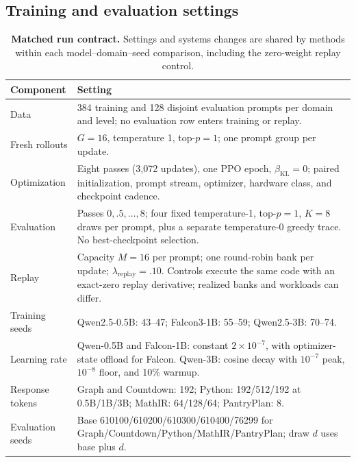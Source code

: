 \documentclass{article}
\newcommand{\1}{\mathbf 1}
\theoremstyle{remark}
\theoremstyle{definition}
\theoremstyle{plain}
\begin{document}
\subsection{Training and evaluation settings}
\label{app:repro-run-contract}
\label{app:comparison-design}

\begin{table}[H]
  \centering
  \caption{\textbf{Matched run contract.} Settings and systems changes are
  shared by methods within each model--domain--seed comparison, including
  the zero-weight replay control.}
  \label{tab:run-contract}
  \small
  \begin{tabularx}{\linewidth}{@{}P{.23\linewidth}Y@{}}
    \toprule
    \textbf{Component} & \textbf{Setting} \\
    \midrule
    Data & 384 training and 128 disjoint evaluation prompts per domain and
      level; no evaluation row enters training or replay. \\
    Fresh rollouts & $G=16$, temperature 1, top-$p=1$; one prompt group per update. \\
    Optimization & Eight passes (3,072 updates), one PPO epoch,
      $\beta_{\mathrm{KL}}=0$; paired initialization, prompt stream,
      optimizer, hardware class, and checkpoint cadence. \\
    Evaluation & Passes $0,.5,\ldots,8$; four fixed temperature-1,
      top-$p=1$, $K=8$ draws per prompt, plus a separate temperature-0
      greedy trace. No best-checkpoint selection. \\
    Replay & Capacity $M=16$ per prompt; one round-robin bank per update;
      $\lambda_{\mathrm{replay}}=.10$. Controls execute the same code with
      an exact-zero replay derivative; realized banks and workloads can differ. \\
    Training seeds & Qwen2.5-0.5B: 43--47; Falcon3-1B: 55--59;
      Qwen2.5-3B: 70--74. \\
    Learning rate & Qwen-0.5B and Falcon-1B: constant $2\times10^{-7}$,
      with optimizer-state offload for Falcon. Qwen-3B: cosine decay with
      $10^{-7}$ peak, $10^{-8}$ floor, and 10\% warmup. \\
    Response tokens & Graph and Countdown: 192; Python: 192/512/192
      at 0.5B/1B/3B; MathIR: 64/128/64; PantryPlan: 8. \\
    Evaluation seeds & Base 610100/610200/610300/610400/76299 for
      Graph/Countdown/Python/MathIR/PantryPlan; draw $d$ uses base plus $d$. \\
    \bottomrule
  \end{tabularx}
\end{table}
\end{document}
